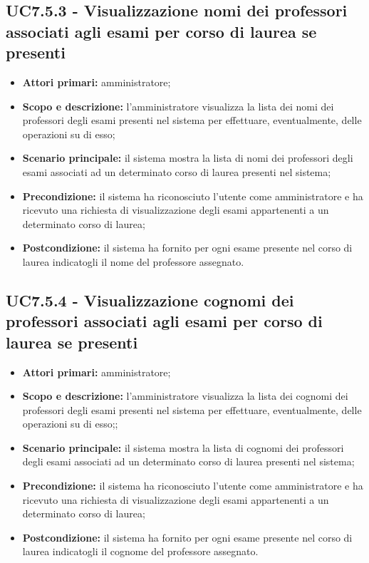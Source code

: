 \documentclass[AnalisiDeiRequisiti.tex]{subfiles}
\begin{document}
\subsection{UC7.5.3 - Visualizzazione nomi dei professori associati agli esami per corso di laurea se presenti}
\begin{itemize}
	\item \textbf{Attori primari:} amministratore;
	\item \textbf{Scopo e descrizione:} l'amministratore visualizza la lista dei nomi dei professori degli esami presenti nel sistema per effettuare, eventualmente, delle operazioni su di esso;
	\item \textbf{Scenario principale:} il sistema mostra la lista di nomi dei professori degli esami associati ad un determinato corso di laurea presenti nel sistema;
	\item \textbf{Precondizione:} il sistema ha riconosciuto l'utente come amministratore e ha ricevuto una richiesta di visualizzazione degli esami appartenenti a un determinato corso di laurea; 
	\item \textbf{Postcondizione:} il sistema ha fornito per ogni esame presente nel corso di laurea indicatogli il nome del professore assegnato.
\end{itemize}
\subsection{UC7.5.4 - Visualizzazione cognomi dei professori associati agli esami per corso di laurea se presenti}
\begin{itemize}
	\item \textbf{Attori primari:} amministratore;
	\item \textbf{Scopo e descrizione:} l'amministratore visualizza la lista dei cognomi dei professori degli esami presenti nel sistema per effettuare, eventualmente, delle operazioni su di esso;;
	\item \textbf{Scenario principale:} il sistema mostra la lista di cognomi dei professori degli esami associati ad un determinato corso di laurea presenti nel sistema;
	\item \textbf{Precondizione:} il sistema ha riconosciuto l'utente come amministratore e ha ricevuto una richiesta di visualizzazione degli esami appartenenti a un determinato corso di laurea; 
	\item \textbf{Postcondizione:} il sistema ha fornito per ogni esame presente nel corso di laurea indicatogli il cognome del professore assegnato.
\end{itemize}
\end{document}
